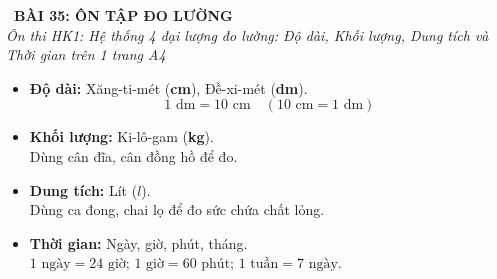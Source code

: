 \documentclass[11pt,a4paper]{article}
\begin{document}
\begin{tcolorbox}[
  enhanced,
  colback=violet!8!white,
  colframe=violet!70!black,
  arc=3mm, boxrule=1.2pt,
  left=3mm, right=3mm, top=2mm, bottom=2mm,
  halign=center
]
  {\LARGE\bfseries\color{violet!90!black}\faBookmark\ BÀI 35: ÔN TẬP ĐO LƯỜNG}\\[1mm]
  {\itshape\footnotesize\color{black!75} Ôn thi HK1: Hệ thống 4 đại lượng đo lường: Độ dài, Khối lượng, Dung tích và Thời gian trên 1 trang A4}
\end{tcolorbox}

\vspace{-2mm}

\noindent
\begin{minipage}[t]{0.49\textwidth}\vspace{0pt}
\begin{tcolorbox}[
  enhanced,
  colback=violet!4!white,
  colframe=violet!75!black,
  arc=2mm, boxrule=0.8pt,
  left=2mm, right=2mm, top=1.8mm, bottom=1.8mm,
  title={\footnotesize\bfseries\color{white}\faKey\ 1. Bảng 4 đại lượng đo lường HK1}
]
{\footnotesize
\begin{itemize}\setlength{\itemsep}{1pt}\setlength{\leftskip}{-2.5mm}
  \item \textbf{Độ dài:} Xăng-ti-mét (\textbf{cm}), Đề-xi-mét (\textbf{dm}).\\
  $$1\text{ dm} = 10\text{ cm} \quad (10\text{ cm} = 1\text{ dm})$$
  \item \textbf{Khối lượng:} Ki-lô-gam (\textbf{kg}).\\
  Dùng cân đĩa, cân đồng hồ để đo.
  \item \textbf{Dung tích:} Lít (\textbf{$l$}).\\
  Dùng ca đong, chai lọ để đo sức chứa chất lỏng.
  \item \textbf{Thời gian:} Ngày, giờ, phút, tháng.\\
  $1\text{ ngày} = 24\text{ giờ}$; $1\text{ giờ} = 60\text{ phút}$; $1\text{ tuần} = 7\text{ ngày}$.
\end{itemize}
}
\end{tcolorbox}
\end{minipage}
\hfill
\end{document}

